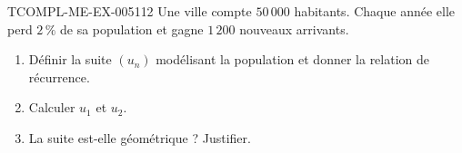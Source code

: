\begin{exercice}{TCOMPL-ME-EX-005}{1}{12}
Une ville compte $50\,000$ habitants. Chaque année elle perd $2\,\%$ de sa
population et gagne $1\,200$ nouveaux arrivants.
\begin{enumerate}
  \item Définir la suite $(u_n)$ modélisant la population et donner la
        relation de récurrence.
  \item Calculer $u_1$ et $u_2$.
  \item La suite est-elle géométrique ? Justifier.
\end{enumerate}
\end{exercice}
